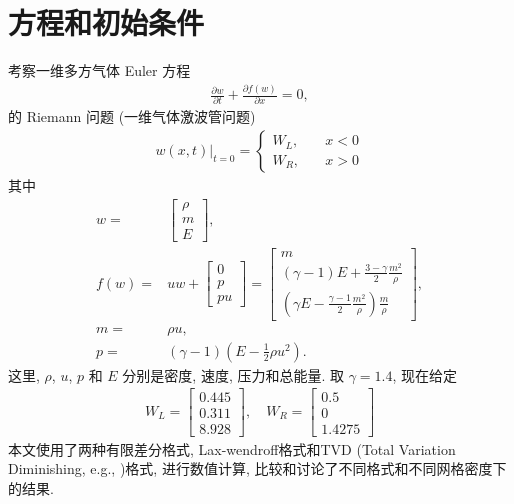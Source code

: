 \documentclass[10.5pt
]{article}
\begin{document}
\section{方程和初始条件}
考察一维多方气体 Euler 方程\citep{Jeffrey1964}
\begin{align}
\frac{\partial w}{\partial t} + \frac{\partial f(w)}{\partial
x}= 0,\label{Eqn:Euler}
\end{align}
的 Riemann 问题 (一维气体激波管问题)
\begin{align}
w(x,t)|_{t=0} = \left\{ \begin{array}{ll}
W_L, & \quad x < 0 \\
W_R, & \quad x > 0
\end{array} \right.
\end{align}
其中
\begin{align}
w =& \left[\begin{array}{c}
\rho\\
m\\
E
\end{array}\right],
\\
f(w) =& u w + \left[\begin{array}{c}
0\\
p\\
p u
\end{array}\right] = \left[\begin{array}{c}
m
\\
(\gamma - 1) E + \frac{3 - \gamma}{2} \frac{m^2}{\rho}
\\
(\gamma E - \frac{\gamma - 1}{2} \frac{m^2}{\rho}) \frac{m}{\rho}
\end{array}\right],
\\
m =& \rho u,
\\
p =& (\gamma - 1)(E - \frac{1}{2} \rho u^2).
\end{align}
这里, $\rho$, $u$, $p$ 和 $E$ 分别是密度, 速度, 压力和总能量. 取 $\gamma=1.4$,
现在给定\citep{Harten1983}
\begin{align}
    W_L = \left[\begin{array}{l}
    0.445\\
    0.311\\
    8.928
    \end{array}\right], \quad W_R = \left[\begin{array}{l}
    0.5\\
    0\\
    1.4275
    \end{array}\right]
\end{align}
本文使用了两种有限差分格式, Lax-wendroff格式和TVD (Total Variation Diminishing, e.g., \cite{vanLeer1974,Harten1983})格式, 进行数值计算, 比较和讨论了不同格式和不同网格密度下的结果.
\end{document}
